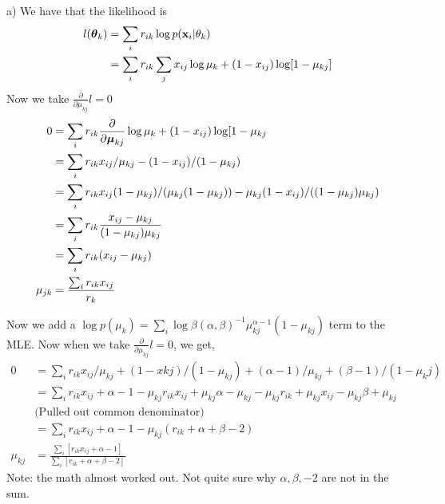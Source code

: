 \documentclass[12pt,letterpaper,fleqn]{hmcpset}
\begin{document}
\vspace{15mm}
a) We have that the likelihood is 
\begin{align*}
    l(\hbox{\boldmath$\theta$}_k) &= \sum_i r_{ik}\log p({\bf x}_i | \theta_k) \\
    &= \sum_i r_{ik} \sum_j x_{ij}\log\mu_k + (1-x_{ij})\log[1-\mu_{kj}] \\
\end{align*}
Now we take $\frac{\partial}{\partial \mu_{kj}} l = 0$
\begin{align*}
    0 &= \sum_i r_{ik} \frac{\partial}{\partial \hbox{\boldmath$\mu$}_{kj}} \log\mu_k + (1-x_{ij})\log[1-\mu_{kj}\\
    &= \sum_i r_{ik} x_{ij}/\mu_{kj} - (1-x_{ij})/(1-\mu_{kj})\\
    &= \sum_i r_{ik} x_{ij}(1-\mu_{kj}) /(\mu_{kj}(1-\mu_{kj})) - \mu_{kj}(1-x_{ij})/((1-\mu_{kj})\mu_{kj}) \\
    &= \sum_i r_{ik} \frac{x_{ij} - \mu_{kj}}{(1-\mu_{kj})\mu_{kj}}\\
    &= \sum_i r_{ik} (x_{ij} - \mu_{kj}) \\
    \mu_{jk} &= \frac{\sum_i r_{ik}x_{ij}}{r_k}
\end{align*}

Now we add a $\log p(\mu_k) = \sum_i \log \beta(\alpha, \beta)^{-1} \mu_{kj}^{\alpha -1} (1-\mu_{kj})$ term to the MLE. Now when we take $\frac{\partial}{\partial \mu_{kj}} l = 0$, we get,
\begin{align*}
    0 &= \sum_i r_{ik}x_{ij}/ \mu_{kj} + (1-x{kj})/(1-\mu_{kj}) + (\alpha -1) / \mu_{kj} + (\beta - 1) / (1-\mu_kj) \\
    &= \sum_{i} r_{ik}x_{ij} + \alpha -1 - \mu_{kj}r_{ik}x_{ij} + \mu_{kj}\alpha - \mu_{kj} - \mu_{kj}r_{ik} + \mu_{kj}x_{ij} - \mu_{kj} \beta + \mu_{kj} \\
    & \text{(Pulled out common denominator)} \\
    &= \sum_i r_{ik}x_{ij} + \alpha -1 - \mu_{kj} (r_{ik} + \alpha + \beta - 2)\\
    \mu_{kj} &= \frac{\sum_i \left[ r_{ik}x_{ij} + \alpha -1 \right]}{\sum_i [r_{ik} + \alpha + \beta -2]}
\end{align*}
Note: the math almost worked out. Not quite sure why $\alpha, \beta, -2$ are not in the sum.
\end{document}

